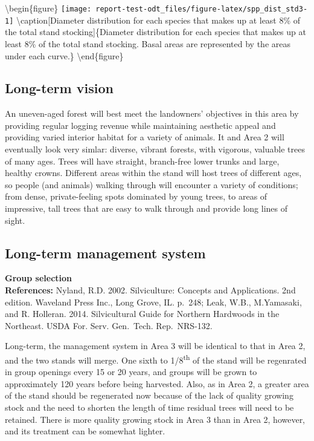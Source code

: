 \documentclass[]{tufte-handout}
\begin{document}
\textbackslash{}begin\{figure\}
\texttt{[image: report-test-odt\_files/figure-latex/spp\_dist\_std3-1]}
\textbackslash{}caption{[}Diameter distribution for each species that
makes up at least 8\% of the total stand stocking{]}\{Diameter
distribution for each species that makes up at least 8\% of the total
stand stocking. Basal areas are represented by the areas under each
curve.\}\label{fig:spp_dist_std3} \textbackslash{}end\{figure\}

\subsection{Long-term vision}\label{long-term-vision-2}

An uneven-aged forest will best meet the landowners' objectives in this
area by providing regular logging revenue while maintaining aesthetic
appeal and providing varied interior habitat for a variety of animals.
It and Area 2 will eventually look very simlar: diverse, vibrant
forests, with vigorous, valuable trees of many ages. Trees will have
straight, branch-free lower trunks and large, healthy crowns. Different
areas within the stand will host trees of different ages, so people (and
animals) walking through will encounter a variety of conditions; from
dense, private-feeling spots dominated by young trees, to areas of
impressive, tall trees that are easy to walk through and provide long
lines of sight.

\subsection{Long-term management
system}\label{long-term-management-system-2}

\textbf{Group selection}\\
\textbf{References:} Nyland, R.D. 2002. Silviculture: Concepts and
Applications. 2nd edition. Waveland Press Inc., Long Grove, IL. p.~248;
Leak, W.B., M.Yamasaki, and R. Holleran. 2014. Silvicultural Guide for
Northern Hardwoods in the Northeast. USDA For. Serv. Gen.~Tech.
Rep.~NRS-132.

Long-term, the management system in Area 3 will be identical to that in
Area 2, and the two stands will merge. One sixth to
1/8\textsuperscript{th} of the stand will be regenrated in group
openings every 15 or 20 years, and groups will be grown to approximately
120 years before being harvested. Also, as in Area 2, a greater area of
the stand should be regenerated now because of the lack of quality
growing stock and the need to shorten the length of time residual trees
will need to be retained. There is more quality growing stock in Area 3
than in Area 2, however, and its treatment can be somewhat lighter.
\end{document}
